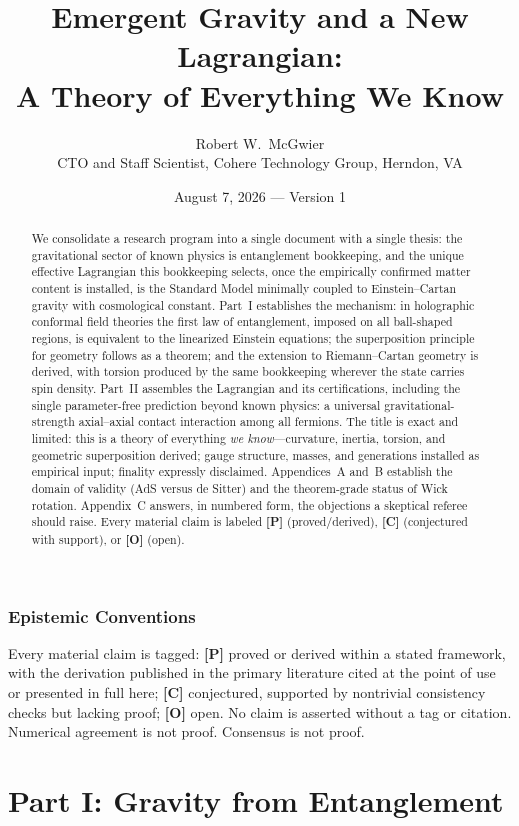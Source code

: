 \documentclass[11pt]{article}
\title{\textbf{Emergent Gravity and a New Lagrangian:\\
A Theory of Everything We Know}}
\author{Robert W.\ McGwier\\
\small CTO and Staff Scientist, Cohere Technology Group, Herndon, VA}
\date{August 7, 2026 --- Version 1}
\theoremstyle{definition}
\newcommand{\pP}{\textbf{[P]}}
\newcommand{\pC}{\textbf{[C]}}
\newcommand{\pO}{\textbf{[O]}}
\begin{document}
\maketitle

\begin{abstract}
\noindent
We consolidate a research program \cite{McGwier2026a,McGwier2026b,
McGwier2026c} into a single document with a single thesis: the
gravitational sector of known physics is entanglement bookkeeping, and the
unique effective Lagrangian this bookkeeping selects, once the empirically
confirmed matter content is installed, is the Standard Model minimally
coupled to Einstein--Cartan gravity with cosmological constant. Part~I
establishes the mechanism: in holographic conformal field theories the
first law of entanglement, imposed on all ball-shaped regions, is
equivalent to the linearized Einstein equations; the superposition
principle for geometry follows as a theorem; and the extension to
Riemann--Cartan geometry is derived, with torsion produced by the same
bookkeeping wherever the state carries spin density. Part~II assembles the
Lagrangian and its certifications, including the single parameter-free
prediction beyond known physics: a universal gravitational-strength
axial--axial contact interaction among all fermions. The title is exact
and limited: this is a theory of everything \emph{we know}---curvature,
inertia, torsion, and geometric superposition derived; gauge structure,
masses, and generations installed as empirical input; finality expressly
disclaimed. Appendices~A and~B establish the domain of validity (AdS
versus de Sitter) and the theorem-grade status of Wick rotation.
Appendix~C answers, in numbered form, the objections a skeptical referee
should raise. Every material claim is labeled \pP{} (proved/derived),
\pC{} (conjectured with support), or \pO{} (open).
\end{abstract}

\section*{Epistemic Conventions}
Every material claim is tagged: \pP{} proved or derived within a stated
framework, with the derivation published in the primary literature cited
at the point of use or presented in full here; \pC{} conjectured,
supported by nontrivial consistency checks but lacking proof; \pO{} open.
No claim is asserted without a tag or citation. Numerical agreement is not
proof. Consensus is not proof.

\part*{Part I: Gravity from Entanglement}
\end{document}
